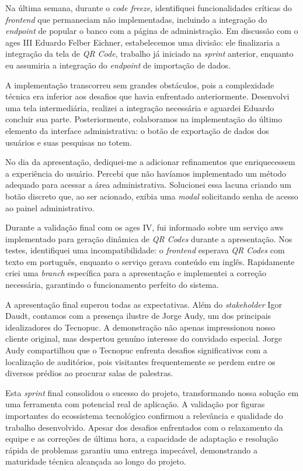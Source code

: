 Na última semana, durante o \textit{code freeze}, identifiquei funcionalidades críticas do \textit{frontend} que permaneciam não implementadas, incluindo a integração do \textit{endpoint} de popular o banco com a página de administração. Em discussão com o \ac{ages} III Eduardo Felber Eichner, estabelecemos uma divisão: ele finalizaria a integração da tela de \textit{QR Code}, trabalho já iniciado na \textit{sprint} anterior, enquanto eu assumiria a integração do \textit{endpoint} de importação de dados.

A implementação transcorreu sem grandes obstáculos, pois a complexidade técnica era inferior aos desafios que havia enfrentado anteriormente. Desenvolvi uma tela intermediária, realizei a integração necessária e aguardei Eduardo concluir sua parte. Posteriormente, colaboramos na implementação do último elemento da interface administrativa: o botão de exportação de dados dos usuários e suas pesquisas no totem.

No dia da apresentação, dediquei-me a adicionar refinamentos que enriquecessem a experiência do usuário. Percebi que não havíamos implementado um método adequado para acessar a área administrativa. Solucionei essa lacuna criando um botão discreto que, ao ser acionado, exibia uma \textit{modal} solicitando senha de acesso ao painel administrativo.

Durante a validação final com os \ac{ages} IV, fui informado sobre um serviço \ac{aws} implementado para geração dinâmica de \textit{QR Codes} durante a apresentação. Nos testes, identifiquei uma incompatibilidade: o \textit{frontend} esperava \textit{QR Codes} com texto em português, enquanto o serviço gerava conteúdo em inglês. Rapidamente criei uma \textit{branch} específica para a apresentação e implementei a correção necessária, garantindo o funcionamento perfeito do sistema.

A apresentação final superou todas as expectativas. Além do \textit{stakeholder} Igor Daudt, contamos com a presença ilustre de Jorge Audy, um dos principais idealizadores do Tecnopuc. A demonstração não apenas impressionou nosso cliente original, mas despertou genuíno interesse do convidado especial. Jorge Audy compartilhou que o Tecnopuc enfrenta desafios significativos com a localização de auditórios, pois visitantes frequentemente se perdem entre os diversos prédios ao procurar salas de palestras.

Esta \textit{sprint} final consolidou o sucesso do projeto, transformando nossa solução em uma ferramenta com potencial real de aplicação. A validação por figuras importantes do ecossistema tecnológico confirmou a relevância e qualidade do trabalho desenvolvido. Apesar dos desafios enfrentados com o relaxamento da equipe e as correções de última hora, a capacidade de adaptação e resolução rápida de problemas garantiu uma entrega impecável, demonstrando a maturidade técnica alcançada ao longo do projeto.
